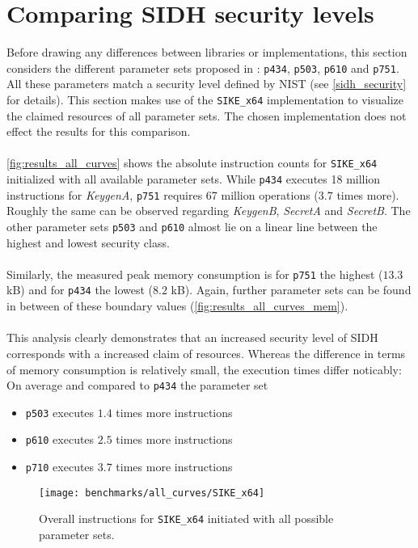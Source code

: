 \section{Comparing SIDH security levels}\label{sec:analysis_sidh_levels}

Before drawing any differences between libraries or implementations, this section considers the different parameter sets proposed in \parencite{sike2020spec}: \texttt{p434}, \texttt{p503}, \texttt{p610} and \texttt{p751}. All these parameters match a security level defined by NIST (see \autoref{sidh_security} for details). This section makes use of the \texttt{SIKE\_x64} implementation to visualize the claimed resources of all parameter sets. The chosen implementation does not effect the results for this comparison.\\\\
\autoref{fig:results_all_curves} shows the absolute instruction counts for \texttt{SIKE\_x64} initialized with all available parameter sets. While \texttt{p434} executes 18 million instructions for \textit{KeygenA}, \texttt{p751} requires 67 million operations ($3.7$ times more). Roughly the same can be observed regarding \textit{KeygenB}, \textit{SecretA} and \textit{SecretB}. The other parameter sets \texttt{p503} and \texttt{p610} almost lie on a linear line between the highest and lowest security class.\\\\
Similarly, the measured peak memory consumption is for \texttt{p751} the highest ($13.3$ kB) and for \texttt{p434} the lowest ($8.2$ kB). Again, further parameter sets can be found in between of these boundary values (\autoref{fig:results_all_curves_mem}). \\\\
This analysis clearly demonstrates that an increased security level of SIDH corresponds with a increased claim of resources. Whereas the difference in terms of memory consumption is relatively small, the execution times differ noticably: On average and compared to \texttt{p434} the parameter set
\begin{itemize}
\itemsep0em 
\item \texttt{p503} executes $1.4$ times more instructions
\item \texttt{p610} executes $2.5$ times more instructions
\item \texttt{p710} executes $3.7$ times more instructions
\end{itemize}

\begin{figure}[H]
  \centering
  \texttt{[image: benchmarks/all\_curves/SIKE\_x64]}
  \caption[Overall instructions for all parameter sets via \texttt{SIKE\_x64}]
  {Overall instructions for \texttt{SIKE\_x64} initiated with all possible parameter sets.}
  \label{fig:results_all_curves}
\end{figure}

